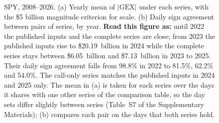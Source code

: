 \begin{figure}[!htbp]
\centering
\resultfigure{\figSeries}
\caption{SPY, 2008--2026. (a) Yearly mean of $|\mathrm{GEX}|$ under each series, with the \$5 billion magnitude criterion for scale. (b) Daily sign agreement between pairs of series, by year. \textbf{Read this figure as:} until 2022 the published inputs and the complete series are close; from 2023 the published inputs rise to \$20.19~billion in 2024 while the complete series stays between \$6.05~billion and \$7.13~billion in 2023 to 2025. Their daily sign agreement falls from 98.8\% in 2022 to 81.5\%, 62.2\% and 54.0\%. The call-only series matches the published inputs in 2024 and 2025 only. The mean in (a) is taken for each series over the days it shares with one other series of the comparison table, so the day sets differ slightly between series (Table~S7 of the Supplementary Materials); (b) compares each pair on the days that both series hold.}
\label{fig:series}
\end{figure}
